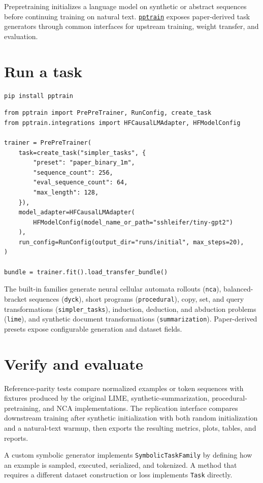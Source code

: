 \documentclass[11pt]{article}
\begin{document}
Prepretraining initializes a language model on synthetic or abstract sequences before continuing training on natural text. \href{https://github.com/Axym-Labs/pptrain}{\texttt{pptrain}} exposes paper-derived task generators through common interfaces for upstream training, weight transfer, and evaluation.

\section{Run a task}\label{run-a-task}

\begin{verbatim}
pip install pptrain
\end{verbatim}

\begin{verbatim}
from pptrain import PrePreTrainer, RunConfig, create_task
from pptrain.integrations import HFCausalLMAdapter, HFModelConfig

trainer = PrePreTrainer(
    task=create_task("simpler_tasks", {
        "preset": "paper_binary_1m",
        "sequence_count": 256,
        "eval_sequence_count": 64,
        "max_length": 128,
    }),
    model_adapter=HFCausalLMAdapter(
        HFModelConfig(model_name_or_path="sshleifer/tiny-gpt2")
    ),
    run_config=RunConfig(output_dir="runs/initial", max_steps=20),
)

bundle = trainer.fit().load_transfer_bundle()
\end{verbatim}

The built-in families generate neural cellular automata rollouts (\texttt{nca}), balanced-bracket sequences (\texttt{dyck}), short programs (\texttt{procedural}), copy, set, and query transformations (\texttt{simpler\_tasks}), induction, deduction, and abduction problems (\texttt{lime}), and synthetic document transformations (\texttt{summarization}). Paper-derived presets expose configurable generation and dataset fields.

\section{Verify and evaluate}\label{test-the-mechanism}

Reference-parity tests compare normalized examples or token sequences with fixtures produced by the original LIME, synthetic-summarization, procedural-pretraining, and NCA implementations. The replication interface compares downstream training after synthetic initialization with both random initialization and a natural-text warmup, then exports the resulting metrics, plots, tables, and reports.

A custom symbolic generator implements \texttt{SymbolicTaskFamily} by defining how an example is sampled, executed, serialized, and tokenized. A method that requires a different dataset construction or loss implements \texttt{Task} directly.
\end{document}
